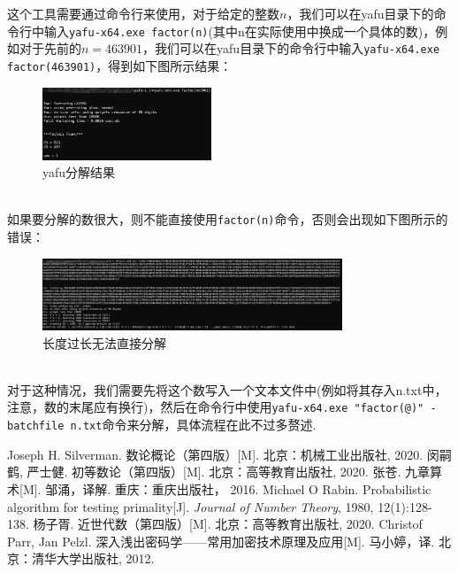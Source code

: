 \documentclass{book}
\numberwithin{equation}{subsubsection}
\begin{document}
这个工具需要通过命令行来使用，对于给定的整数$n$，我们可以在yafu目录下的命令行中输入\texttt{yafu-x64.exe factor(n)}(其中n在实际使用中换成一个具体的数)，例如对于先前的$n=463901$，我们可以在yafu目录下的命令行中输入\texttt{yafu-x64.exe factor(463901)}，得到如下图所示结果：
\begin{figure}[h!]
    \centering
    \includegraphics[width=0.45\textwidth]{Picture/yafuFactor1.png}
    \caption{yafu分解结果}
\end{figure}\\
如果要分解的数很大，则不能直接使用\texttt{factor(n)}命令，否则会出现如下图所示的错误：
\begin{figure}[h!]
    \centering
    \includegraphics[width=0.8\textwidth]{Picture/yafuFactor2.png}
    \caption{长度过长无法直接分解}
\end{figure}\\
对于这种情况，我们需要先将这个数写入一个文本文件中(例如将其存入n.txt中，注意，数的末尾应有换行)，然后在命令行中使用\texttt{yafu-x64.exe "factor(@)" -batchfile n.txt}命令来分解，具体流程在此不过多赘述.

\newpage
\begin{thebibliography}{99}
     Joseph H. Silverman. 数论概论（第四版）[M]. 北京：机械工业出版社, 2020.
     闵嗣鹤, 严士健. 初等数论（第四版）[M]. 北京：高等教育出版社, 2020.  
     张苍. 九章算术[M]. 邹涌，译解. 重庆：重庆出版社， 2016.
     Michael O Rabin. Probabilistic algorithm for testing primality[J]. \textit{Journal of Number Theory}, 1980, 12(1):128-138.
     杨子胥. 近世代数（第四版）[M]. 北京：高等教育出版社, 2020.
     Christof Parr, Jan Pelzl. 深入浅出密码学——常用加密技术原理及应用[M]. 马小婷，译. 北京：清华大学出版社, 2012.
\end{thebibliography}
\end{document}

